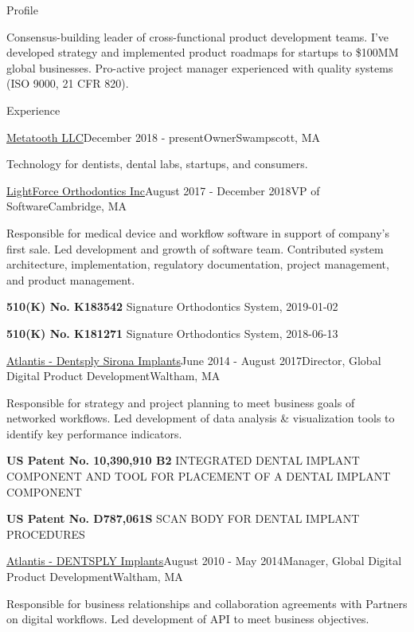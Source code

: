 \documentclass{resume}
\begin{document}
  
\begin{rSection}{Profile}
\item Consensus-building leader of cross-functional product development teams. I've developed strategy and implemented product roadmaps for startups to \$100MM global businesses. Pro-active project manager experienced with quality systems (ISO 9000, 21 CFR 820).
\end{rSection}

\begin{rSection}{Experience}

\begin{rSubsection}{\href{https://metatooth.com}{Metatooth LLC}}{December 2018 - present}{Owner}{Swampscott, MA}
\item Technology for dentists, dental labs, startups, and consumers.
\end{rSubsection}

\begin{rSubsection}{\href{https://lightforceortho.com}{LightForce Orthodontics Inc}}{August 2017 - December 2018}{VP of Software}{Cambridge, MA}
\item Responsible for medical device and workflow software in support of company's first sale.  Led development and growth of software team. Contributed system architecture, implementation, regulatory documentation, project management, and product management.
\item \textbf{510(K) No. K183542} Signature Orthodontics System, 2019-01-02
\item \textbf{510(K) No. K181271} Signature Orthodontics System, 2018-06-13
\end{rSubsection}


\begin{rSubsection}{\href{https://dentsplysirona.com}{Atlantis - Dentsply Sirona Implants}}{June 2014 - August 2017}{Director, Global Digital Product Development}{Waltham, MA}
\item Responsible for strategy and project planning to meet business goals of networked workflows.  Led development of data analysis \& visualization tools to identify key performance indicators.
\item \textbf{US Patent No. 10,390,910 B2} INTEGRATED DENTAL IMPLANT COMPONENT AND TOOL FOR PLACEMENT OF A DENTAL IMPLANT COMPONENT
\item \textbf{US Patent No. D787,061S} SCAN BODY FOR DENTAL IMPLANT PROCEDURES
\end{rSubsection}

\begin{rSubsection}{\href{https://dentsplysirona.com}{Atlantis - DENTSPLY Implants}}{August 2010 - May 2014}{Manager, Global Digital Product Development}{Waltham, MA}
\item Responsible for business relationships and collaboration agreements with Partners on digital workflows.  Led development of API to meet business objectives.
\end{rSubsection}


\end{rSection}
\end{document}
